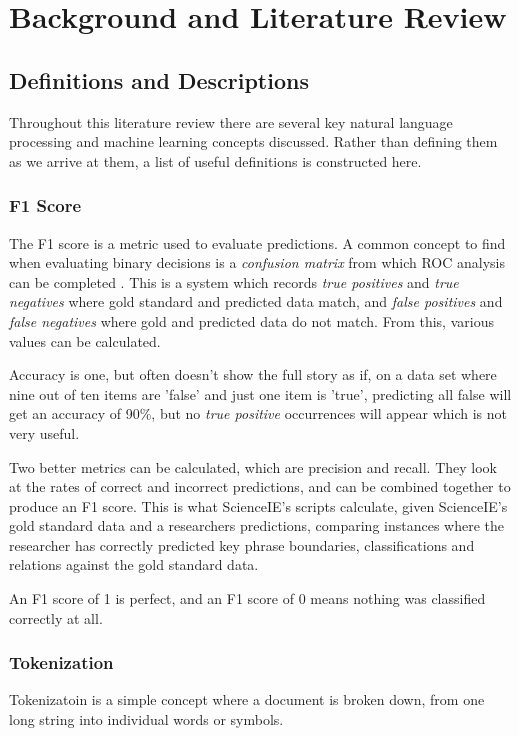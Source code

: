 \chapter{Background and Literature Review}

\section{Definitions and Descriptions}
Throughout this literature review there are several key natural language processing and machine learning concepts discussed. Rather than defining them as we arrive at them, a list of useful definitions is constructed here.

\subsection*{F1 Score}
The F1 score is a metric used to evaluate predictions. A common concept to find when evaluating binary decisions is a \textit{confusion matrix} from which ROC analysis can be completed \cite{Fawcett2006}. This is a system which records \textit{true positives} and \textit{true negatives} where gold standard and predicted data match, and \textit{false positives} and \textit{false negatives} where gold and predicted data do not match. From this, various values can be calculated. 

Accuracy is one, but often doesn't show the full story as if, on a data set where nine out of ten items are 'false' and just one item is 'true', predicting all false will get an accuracy of 90\%, but no \textit{true positive} occurrences will appear which is not very useful. 

Two better metrics can be calculated, which are precision and recall. They look at the rates of correct and incorrect predictions, and can be combined together to produce an F1 score. This is what ScienceIE's scripts calculate, given ScienceIE's gold standard data and a researchers predictions, comparing instances where the researcher has correctly predicted key phrase boundaries, classifications and relations against the gold standard data.

An F1 score of 1 is perfect, and an F1 score of 0 means nothing was classified correctly at all.

\subsection*{Tokenization}
Tokenizatoin is a simple concept where a document is broken down, from one long string into individual words or symbols. 

